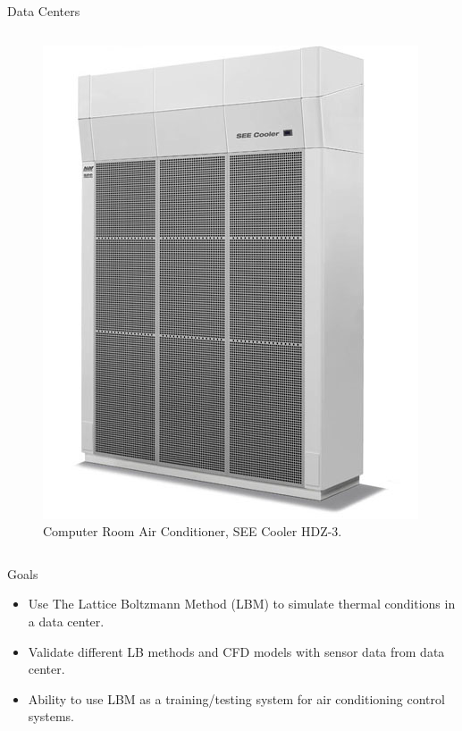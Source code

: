 \documentclass{beamer}
\begin{document}
\begin{frame}{Data Centers}
\begin{columns}[T]
\begin{column}{.5\textwidth}
\begin{figure}[ht]
\begin{center}
\includegraphics[width=0.95\linewidth]{crac.jpg}
\end{center}
\caption{Computer Room Air Conditioner, SEE Cooler HDZ-3.}
\end{figure}
\end{column}%
\end{columns}
\end{frame}

\begin{frame}{Goals}
\begin{itemize}
\item Use The Lattice Boltzmann Method (LBM) to simulate thermal conditions in a data center.
\item Validate different LB methods and CFD models with sensor data from data center.
\item Ability to use LBM as a training/testing system for air conditioning control systems. 
\end{itemize}
\end{frame}
\end{document}
